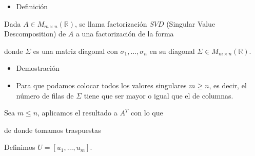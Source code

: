 \documentclass[12pt]{article}
\begin{document}
\begin{itemize}[label=\color{red}\textbullet, leftmargin=*]
    \item \color{lightblue} Definición
\end{itemize}
Dada $A\in M_{m\times n}(\mathbb{R})$, se llama factorización $SVD$ (Singular Value Descomposition) de $A$ a una factorización de la forma \begin{center}
\end{center} donde $\Sigma$ es una matriz diagonal con $\sigma_1,\hdots,\sigma_n$ en su diagonal $\Sigma\in M_{m\times n}(\mathbb{R})$.
\begin{itemize}[label=\color{red}\textbullet, leftmargin=*]
    \item \color{lightblue}Demostración
\end{itemize}
\begin{center}
\end{center}
\begin{itemize}[label=$\longrightarrow$]
\item Para que podamos colocar todos los valores singulares $m\ge n$, es decir, el número de filas de $\Sigma$ tiene que ser mayor o igual que el de columnas.
\end{itemize}
Sea $m\le n$, aplicamos el resultado a $A^T$ con lo que \begin{center}
\end{center} de donde tomamos traspuestas \begin{center}
\end{center}
Definimos $U=[u_1,\hdots,u_m]$.
\end{document}

